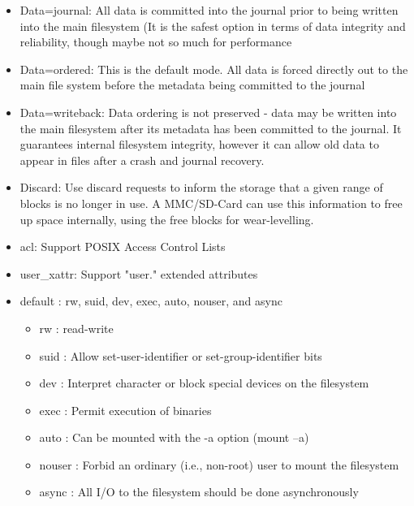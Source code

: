 \documentclass[resume]{subfiles}
\begin{document}
\begin{itemize}
    \item Data=journal: All data is committed into the journal prior to being written into the main filesystem (It is the safest option in terms of data integrity and reliability, though maybe not so much for performance
    \item Data=ordered: This is the default mode. All data is forced directly out to the main file system before the metadata being committed to the journal
    \item Data=writeback: Data ordering is not preserved - data may be written into the main filesystem after its metadata has been committed to the journal. It guarantees internal filesystem integrity, however it can allow old data to appear in files after a crash and journal recovery.
    \item Discard: Use discard requests to inform the storage that a given range of blocks is no longer in use. A MMC/SD-Card can use this information to free up space internally, using the free blocks for wear-levelling.
    \item acl: Support POSIX Access Control Lists
    \item user\_xattr: Support "user." extended attributes
    \item default : rw, suid, dev, exec, auto, nouser, and async
    \begin{itemize}
        \item rw : read-write
        \item suid : Allow set-user-identifier or set-group-identifier bits
        \item dev : Interpret character or block special devices on the filesystem
        \item exec : Permit execution of binaries
        \item auto : Can be mounted with the -a option (mount –a)
        \item nouser : Forbid an ordinary (i.e., non-root) user to mount the filesystem
        \item async : All I/O to the filesystem should be done asynchronously
    \end{itemize}
\end{itemize}
\end{document}

